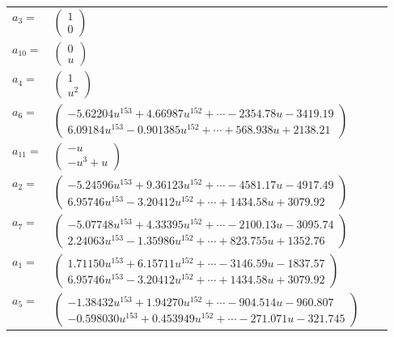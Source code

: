\documentclass[1p]{elsarticle_modified}
\theoremstyle{definition}
\begin{document}
\begin{tabular}{m{7pt} m{180pt} m{7pt} m{180pt} }
\flushright $a_{3}=$&$\begin{pmatrix}1\\0\end{pmatrix}$ \\
\flushright $a_{10}=$&$\begin{pmatrix}0\\u\end{pmatrix}$ \\
\flushright $a_{4}=$&$\begin{pmatrix}1\\u^2\end{pmatrix}$ \\
\flushright $a_{6}=$&$\begin{pmatrix}-5.62204 u^{153}+4.66987 u^{152}+\cdots-2354.78 u-3419.19\\6.09184 u^{153}-0.901385 u^{152}+\cdots+568.938 u+2138.21\end{pmatrix}$ \\
\flushright $a_{11}=$&$\begin{pmatrix}- u\\- u^3+u\end{pmatrix}$ \\
\flushright $a_{2}=$&$\begin{pmatrix}-5.24596 u^{153}+9.36123 u^{152}+\cdots-4581.17 u-4917.49\\6.95746 u^{153}-3.20412 u^{152}+\cdots+1434.58 u+3079.92\end{pmatrix}$ \\
\flushright $a_{7}=$&$\begin{pmatrix}-5.07748 u^{153}+4.33395 u^{152}+\cdots-2100.13 u-3095.74\\2.24063 u^{153}-1.35986 u^{152}+\cdots+823.755 u+1352.76\end{pmatrix}$ \\
\flushright $a_{1}=$&$\begin{pmatrix}1.71150 u^{153}+6.15711 u^{152}+\cdots-3146.59 u-1837.57\\6.95746 u^{153}-3.20412 u^{152}+\cdots+1434.58 u+3079.92\end{pmatrix}$ \\
\flushright $a_{5}=$&$\begin{pmatrix}-1.38432 u^{153}+1.94270 u^{152}+\cdots-904.514 u-960.807\\-0.598030 u^{153}+0.453949 u^{152}+\cdots-271.071 u-321.745\end{pmatrix}$ \\

\end{tabular}
\end{document}

